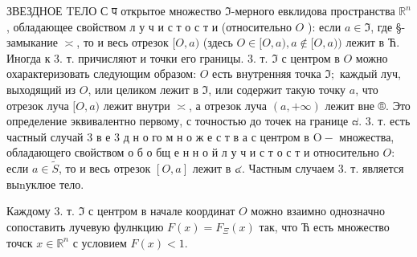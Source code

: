\documentclass[10pt]{article}
\begin{document}
ЗВЕЗДНОЕ TЕЛО С प открытое множество $\Im$-мерного евклидова пространства $\mathbb{R}^{n}$, обладающее свойством л у ч и с т о с т и (относительно $O$ ): если $a \in \Im$, где §- замыкание $\asymp$, то и весь отрезок $[O, a)$ (здесь $O \in[O, a), a \notin[O, a))$ лежит в Ћ. Иногда к 3. т. причисляют и точки его границы. 3. т. $\Im$ с центром в $O$ можно охарактеризовать следующим образом: $O$ есть внутренняя точка $\Im ;$ каждый луч, выходящий из $O$, или целиком лежит в $\Im$, или содержит такую точку $a$, что отрезок луча $[O, a)$ лежит внутри $\asymp$, а отрезок луча $(a,+\infty)$ лежит вне ®. Это определение эквивалентно первому, с точностью до точек на границе ๘. 3. т. есть частный случай 3 в е 3 д н о го м н о ж е с т в а с центром в $\mathrm{O}-$ множества, обладающего свойством о б о бщ е н н о й л у ч и с т о с т и относительно $O:$ если $a \in \widetilde{S}$, то и весь отрезок $[O, a]$ лежит в ๔. Частным случаем 3. т. является выnуклюе тело.



Каждому 3. т. $\Im$ с центром в начале координат $O$ можно взаимно однозначно сопоставить лучевую фулнкцию $F(x)=F_{\Xi}(x)$ так, что Ћ есть множество точск $x \in \mathbb{R}^{n}$ с условием $F(x)<1$.
\end{document}
